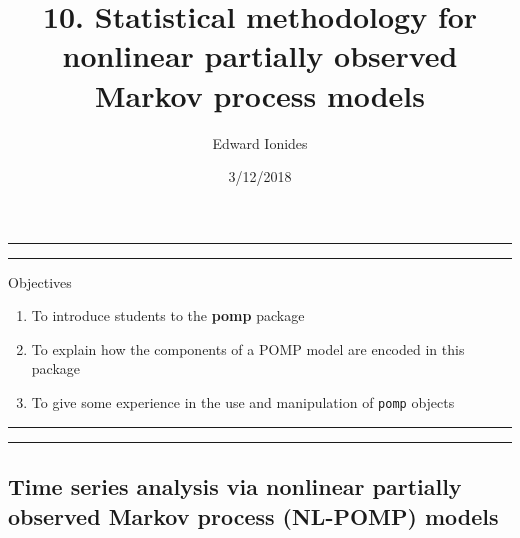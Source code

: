 \documentclass[]{article}
\title{10. Statistical methodology for nonlinear partially observed Markov
process models}
\author{Edward Ionides}
\date{3/12/2018}
\begin{document}
\maketitle

{
\setcounter{tocdepth}{2}
\tableofcontents
}
\newcommand\prob{\mathbb{P}}
\newcommand\E{\mathbb{E}}
\newcommand\var{\mathrm{Var}}
\newcommand\cov{\mathrm{Cov}}
\newcommand\loglik{\ell}
\newcommand\R{\mathbb{R}}
\newcommand\data[1]{#1^*}
\newcommand\params{\, ; \,}
\newcommand\transpose{\scriptsize{T}}
\newcommand\eqspace{\quad\quad}
\newcommand\myeq[1]{\eqspace \displaystyle #1}
\newcommand\lik{\mathscr{L}}
\newcommand\profileloglik[1]{\ell^\mathrm{profile}_#1}
\newcommand\ar{\phi}
\newcommand\ma{\psi}
\newcommand\AR{\Phi}
\newcommand\MA{\Psi}
\newcommand\ev{u}
\newcommand\given{{\, | \,}}
\newcommand\equals{{=\,}}
\newcommand\matA{\mathbb{A}}
\newcommand\matB{\mathbb{B}}
\newcommand\matH{\mathbb{H}}
\newcommand\covmatX{\mathbb{U}}
\newcommand\covmatY{\mathbb{V}}





\begin{center}\rule{0.5\linewidth}{\linethickness}\end{center}

\begin{center}\rule{0.5\linewidth}{\linethickness}\end{center}

Objectives

\begin{enumerate}
\def\labelenumi{\arabic{enumi}.}
\item
  To introduce students to the \textbf{pomp} package
\item
  To explain how the components of a POMP model are encoded in this
  package
\item
  To give some experience in the use and manipulation of \texttt{pomp}
  objects
\end{enumerate}

\begin{center}\rule{0.5\linewidth}{\linethickness}\end{center}

\begin{center}\rule{0.5\linewidth}{\linethickness}\end{center}

\subsection{Time series analysis via nonlinear partially observed Markov
process (NL-POMP)
models}\label{time-series-analysis-via-nonlinear-partially-observed-markov-process-nl-pomp-models}
\end{document}
